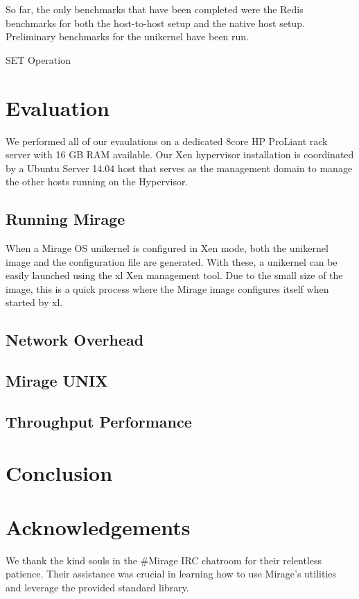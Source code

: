 \documentclass[english,10pt,twocolumn]{article}
\begin{document}
So far, the only benchmarks that have been completed were the Redis benchmarks for both the host-to-host setup and the native host setup. Preliminary benchmarks for the unikernel have been run.

SET Operation




\section{Evaluation}

We performed all of our evaulations on a dedicated 8\-core HP ProLiant rack server with 16 GB RAM available.
Our Xen hypervisor installation is coordinated by a Ubuntu Server 14.04 host that serves as the management domain to manage the other hosts running on the Hypervisor.


\subsection{Running Mirage}

When a Mirage OS unikernel is configured in Xen mode, both the unikernel image and the configuration file are generated.
With these, a unikernel can be easily launched using the xl Xen management tool.
Due to the small size of the image, this is a quick process where the Mirage image configures itself when started by xl.



\subsection{Network Overhead}

\subsection{Mirage \- UNIX}

\subsection{Throughput Performance}


\section{Conclusion}


\section{Acknowledgements}
We thank the kind souls in the \#Mirage IRC chatroom for their relentless patience.
Their assistance was crucial in learning how to use Mirage's utilities and leverage the provided standard library.






\end{document}

